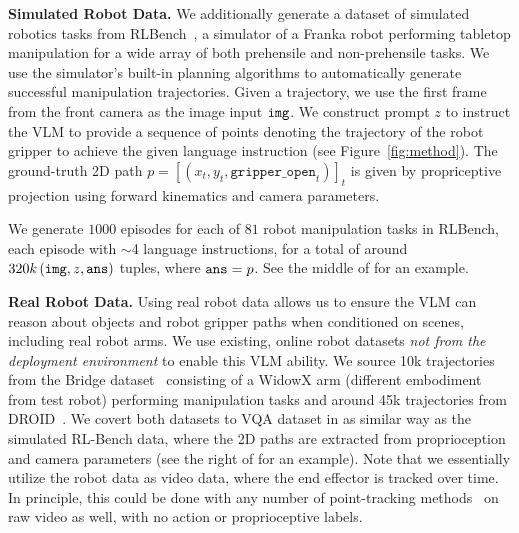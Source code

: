 \textbf{Simulated Robot Data.} We additionally generate a dataset of simulated robotics tasks from RLBench~\citep{james2020rlbench}, a simulator of a Franka robot performing tabletop manipulation for a wide array of both prehensile and non-prehensile tasks.
We use the simulator's built-in planning algorithms to automatically generate successful manipulation trajectories. Given a trajectory, we use the first frame from the front camera as the image input $\tt img$. We construct prompt $z$ to instruct the VLM to provide a sequence of points denoting the trajectory of the robot gripper to achieve the given language instruction (see Figure~\ref{fig:method}). The ground-truth 2D path $p = [(x_t, y_t, \texttt{gripper\_open}_t)]_t$ is given by propriceptive projection using forward kinematics and camera parameters. 

We generate $1000$ episodes for each of $81$ robot manipulation tasks in RLBench, each episode with $\sim$4 language instructions, for a total of around $320k \,({\tt img}, z, {\tt ans}) $ tuples, where ${\tt ans}=p$. See the middle of  for an example. %


\textbf{Real Robot Data.} Using real robot data allows us to ensure the VLM can reason about objects and robot gripper paths when conditioned on scenes, including real robot arms.
We use existing, online robot datasets \emph{not from the deployment environment} to enable this VLM ability.
We source 10k trajectories from the Bridge dataset~\citep{walke2023bridgedata, open_x_embodiment_rt_x_2023} consisting of a WidowX arm (different embodiment from test robot) performing manipulation tasks and around 45k trajectories from DROID~\citep{khazatsky2024droid}. 
We covert both datasets to VQA dataset in as similar way as the simulated RL-Bench data, where the 2D paths are extracted from proprioception and camera parameters (see the right of  for an example).
Note that we essentially utilize the robot data as video data, where the end effector is tracked over time. In principle, this could be done with any number of point-tracking methods~\citep{doersch2023tapir} on raw video as well, with no action or proprioceptive labels.

